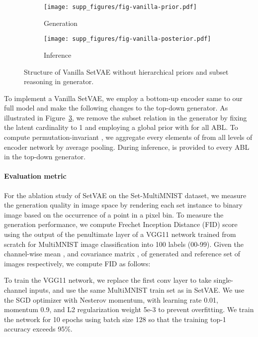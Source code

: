 \documentclass[final]{arxiv/cvpr}
\begin{document}
\begin{figure}[!t]
    \centering
    \begin{subfigure}[b]{0.395\linewidth}
        \centering
        \texttt{[image: supp\_figures/fig-vanilla-prior.pdf]}
        \caption{Generation}
        \label{fig:vanilla_prior}
    \end{subfigure}
    \begin{subfigure}[b]{0.59\linewidth}
        \centering
        \texttt{[image: supp\_figures/fig-vanilla-posterior.pdf]}
        \caption{Inference}
        \label{fig:vanilla_posterior}
    \end{subfigure}
    \caption{Structure of Vanilla SetVAE without hierarchical priors and subset reasoning in generator.}
\label{fig:vanilla_setvae}
\end{figure}
To implement a Vanilla SetVAE, we employ a bottom-up encoder same to our full model and make the following changes to the top-down generator.
As illustrated in Figure~\ref{fig:vanilla_setvae}, we remove the subset relation in the generator by fixing the latent cardinality to 1 and employing a global prior  with  for all ABL.
To compute permutation-invariant ,
we aggregate every elements of  from all levels of encoder network by average pooling.
During inference,  is provided to every ABL in the top-down generator.

\paragraph{Evaluation metric}
For the ablation study of SetVAE on the Set-MultiMNIST dataset, we measure the generation quality in image space by rendering each set instance to  binary image based on the occurrence of a point in a pixel bin.
To measure the generation performance, we compute Frechet Inception Distance (FID) score \cite{heusel2017gans} using the output of the penultimate layer of a VGG11 network trained from scratch for MultiMNIST image classification into 100 labels (00-99).
Given the channel-wise mean ,  and covariance matrix ,  of generated and reference set of images respectively, we compute FID as follows:

To train the VGG11 network, we replace the first conv layer to take single-channel inputs, and use the same MultiMNIST train set as in SetVAE.
We use the SGD optimizer with Nesterov momentum, with learning rate 0.01, momentum 0.9, and L2 regularization weight 5e-3 to prevent overfitting.
We train the network for 10 epochs using batch size 128 so that the training top-1 accuracy exceeds 95\%.
\end{document}
